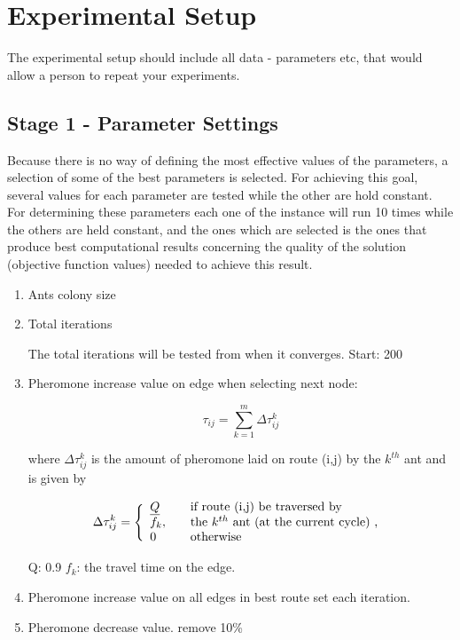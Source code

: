 \section{Experimental Setup}

The experimental setup should include all data - parameters etc, that would allow a person to repeat your experiments. 
 
\subsection{Stage 1 - Parameter Settings}
\label{subsec:parameterSettings_setup}

Because there is no way of defining the most effective values of the parameters, a selection of some of the best parameters is selected. For achieving this goal, several values for each parameter are tested while the other are hold constant. For determining these parameters each one of the instance will run 10 times while the others are held constant, and the ones which are selected is the ones that produce best computational results concerning the quality of the solution (objective function values) needed to achieve this result. 

\begin{enumerate}
\item Ants colony size
\item Total iterations

The total iterations will be tested from when it converges. Start: 200

\item Pheromone increase value on edge when selecting next node:

$$ \tau_{ij} = \sum_{k=1}^{m} \Delta \tau^k_{ij}$$

where $ \Delta \tau^k_{ij} $ is the amount of pheromone laid on route (i,j) by the $k^{th}$ ant and is given by

$$
\Delta \tau^k_{ij} = \Bigg\{
\begin{array}{l l}
\underline{Q} &  \quad \text{if route (i,j) be traversed by}\\
f_k, &  \quad \text{the $k^{th}$ ant (at the current cycle) , }\\
0 &  \quad \text{otherwise}
\end{array}
$$

Q: 0.9
\newline
$f_k$: the travel time on the edge.

\item Pheromone increase value on all edges in best route set each iteration.
\item Pheromone decrease value. remove 10\%

\end{enumerate}

